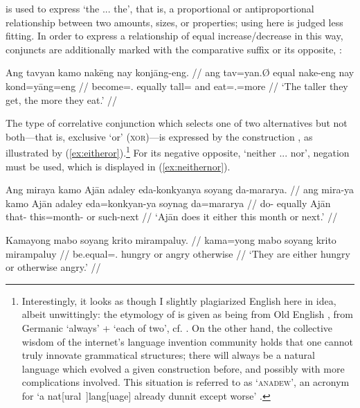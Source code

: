  is used to express `the ... the', that is, a 
proportional or antiproportional relationship between two amounts, sizes, 
or properties; using  here is judged less fitting. In 
order to express a relationship of equal increase/decrease in this way, 
conjuncts are additionally marked with the comparative suffix 
 or its opposite, :

\ex\label{ex:thethe}
\begingl
	\gla Ang tavyan kamo nakēng nay konjāng-eng. //
	\glb ang tav=yan.Ø equal nake-eng nay kond=yāng=eng //
	\glc \AgtT{} become=\TsgM{}.\Top{} equally tall=\Comp{} and 
		eat=\TsgM{}.\Aarg{}=more //
	\glft `The taller they get, the more they eat.' //
\endgl
\xe



The type of correlative conjunction which selects one of two alternatives but
not both---that is, exclusive `or' (\textsc{xor})---is expressed by the
construction , as illustrated
by (\ref{ex:eitheror}).\footnote{Interestingly, it looks as though I slightly
plagiarized English here in idea, albeit unwittingly: the etymology of
 is given as being from Old English , from
Germanic  `always' +  `each of two', cf.
\citet[either, adj. (and pron.) and adv. (and conj.)]{oed}. On the other hand,
the collective wisdom of the internet's language invention community holds that
one cannot truly innovate grammatical structures; there will always be a
natural language which evolved a given construction before, and possibly with
more complications involved. This situation is referred to as
`\textsc{anadew}', an acronym for `a nat[ural~]lang[uage] already dunnit except
worse' \citep{teoh2003}.} For its negative opposite, `neither ... nor',
negation must be used, which is displayed in (\ref{ex:neithernor}).

\pex\label{ex:eitheror}
\a\label{ex:eitherorvb}\begingl
	\gla Ang miraya kamo Ajān adaley eda-konkyanya soyang da-mararya. //
	\glb ang mira-ya kamo Ajān adaley eda=konkyan-ya soynag da=mararya //
	\glc \AgtT{} do-\TsgM{} equally Ajān that-\PargI{} this=month-\Loc{} 
		or such-next //
	\glft `Ajān does it either this month or next.' //
\endgl

\a\label{ex:eitherorpred}\begingl
	\gla Kamayong mabo soyang krito mirampaluy. //
	\glb kama=yong mabo soyang krito mirampaluy //
	\glc be.equal=\TsgN{}.\Aarg{} hungry or angry otherwise //
	\glft `They are either hungry or otherwise angry.' //
\endgl

